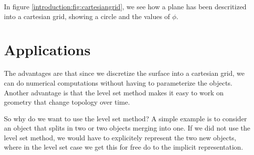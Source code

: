 In figure \vref{introduction:fig:cartesiangrid}, we see how a plane
has been descritized into a cartesian grid, showing a circle and the
values of $\phi$.

\pagebreak








\section{Applications}

The advantages are that since we discretize the surface into a
cartesian grid, we can do numerical computations without having to
parameterize the objects. Another advantage is that the level set
method makes it easy to work on geometry that change topology over
time.



So why do we want to use the level set method? A simple example is to
consider an object that splits in two or two objects merging into
one. If we did not use the level set method, we would have to
explicitely represent the two new objects, where in the level set case
we get this for free do to the implicit representation.





